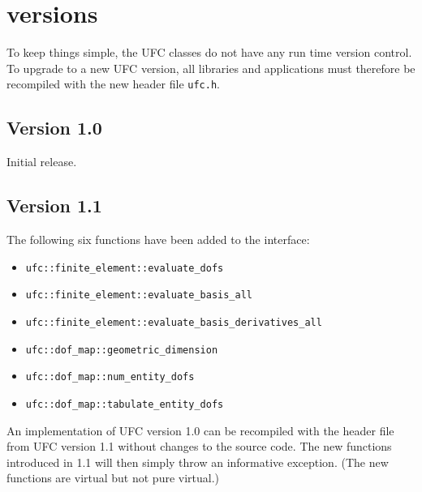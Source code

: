 \chapter{\ufc{} versions}
\label{app:versions}

To keep things simple, the UFC classes do not have any run time
version control. To upgrade to a new UFC version, all libraries and
applications must therefore be recompiled with the new header file
\texttt{ufc.h}.

\section{Version 1.0}
Initial release.

\section{Version 1.1}
The following six functions have been added to the interface:
\begin{itemize}
\item \texttt{ufc::finite\_element::evaluate\_dofs}
\item \texttt{ufc::finite\_element::evaluate\_basis\_all}
\item \texttt{ufc::finite\_element::evaluate\_basis\_derivatives\_all}
\item \texttt{ufc::dof\_map::geometric\_dimension}
\item \texttt{ufc::dof\_map::num\_entity\_dofs}
\item \texttt{ufc::dof\_map::tabulate\_entity\_dofs}
\end{itemize}

An implementation of UFC version 1.0 can be recompiled with the header
file from UFC version 1.1 without changes to the source code. The new
functions introduced in 1.1 will then simply throw an informative
exception. (The new functions are virtual but not pure virtual.)
